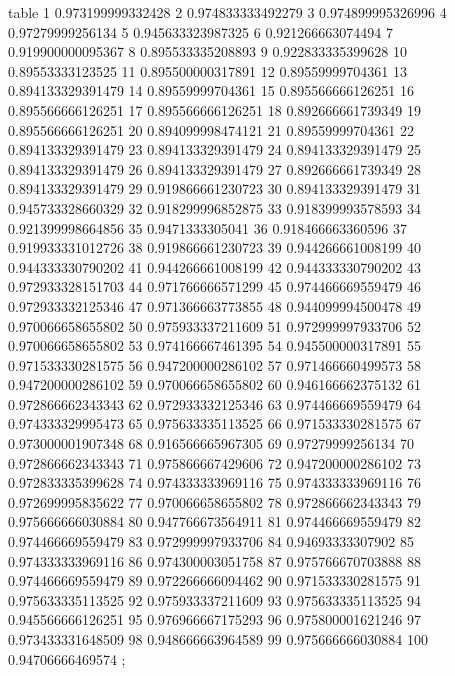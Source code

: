\nextgroupplot[title=Seed 0,
height=\figheight,
legend cell align={left},
legend columns=-1,
legend style={
  fill opacity=0.8,
  draw opacity=1,
  text opacity=1,
  at={(-0.20,1.36)},%
  anchor=south west,
  draw=white!80!black
},
minor xtick={25, 75},
minor ytick={},
tick align=outside,
tick pos=left,
width=\figwidth,
x grid style={white!69.0196078431373!black},
xlabel={Eval. Steps},
xminorgrids,
xmajorgrids,
xmin=-3.95, xmax=104.95,
xtick style={color=black},
xtick={-25,0,50,100,125},
xticklabels={-25,0,50,100,125},
y grid style={white!69.0196078431373!black},
ylabel={ACC (\%)},
ymajorgrids,
ymin=0.88, ymax=0.982,
ytick style={color=black},
ytick={0.88,0.9,0.92,0.94,0.96,0.98,1},
yticklabels={88,90,92,94,96,98,100}
]
table {%
1 0.973199999332428
2 0.974833333492279
3 0.974899995326996
4 0.97279999256134
5 0.945633323987325
6 0.921266663074494
7 0.919900000095367
8 0.895533335208893
9 0.922833335399628
10 0.89553333123525
11 0.895500000317891
12 0.89559999704361
13 0.894133329391479
14 0.89559999704361
15 0.895566666126251
16 0.895566666126251
17 0.895566666126251
18 0.892666661739349
19 0.895566666126251
20 0.894099998474121
21 0.89559999704361
22 0.894133329391479
23 0.894133329391479
24 0.894133329391479
25 0.894133329391479
26 0.894133329391479
27 0.892666661739349
28 0.894133329391479
29 0.919866661230723
30 0.894133329391479
31 0.945733328660329
32 0.918299996852875
33 0.918399993578593
34 0.921399998664856
35 0.9471333305041
36 0.918466663360596
37 0.919933331012726
38 0.919866661230723
39 0.944266661008199
40 0.944333330790202
41 0.944266661008199
42 0.944333330790202
43 0.972933328151703
44 0.971766666571299
45 0.974466669559479
46 0.972933332125346
47 0.971366663773855
48 0.944099994500478
49 0.970066658655802
50 0.975933337211609
51 0.972999997933706
52 0.970066658655802
53 0.974166667461395
54 0.945500000317891
55 0.971533330281575
56 0.947200000286102
57 0.971466660499573
58 0.947200000286102
59 0.970066658655802
60 0.946166662375132
61 0.972866662343343
62 0.972933332125346
63 0.974466669559479
64 0.974333329995473
65 0.975633335113525
66 0.971533330281575
67 0.973000001907348
68 0.916566665967305
69 0.97279999256134
70 0.972866662343343
71 0.975866667429606
72 0.947200000286102
73 0.972833335399628
74 0.974333333969116
75 0.974333333969116
76 0.972699995835622
77 0.970066658655802
78 0.972866662343343
79 0.975666666030884
80 0.947766673564911
81 0.974466669559479
82 0.974466669559479
83 0.972999997933706
84 0.94693333307902
85 0.974333333969116
86 0.974300003051758
87 0.975766670703888
88 0.974466669559479
89 0.972266666094462
90 0.971533330281575
91 0.975633335113525
92 0.975933337211609
93 0.975633335113525
94 0.945566666126251
95 0.976966667175293
96 0.975800001621246
97 0.973433331648509
98 0.948666663964589
99 0.975666666030884
100 0.94706666469574
};
